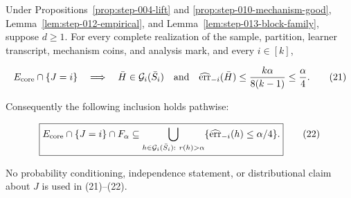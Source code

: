\begin{proposition}\label{prop:step-013-pathwise}
Under  Propositions~\ref{prop:step-004-lift} and
\ref{prop:step-010-mechanism-good}, Lemma~\ref{lem:step-012-empirical}, and
Lemma~\ref{lem:step-013-block-family}, suppose \(d\geq1\). For every
complete realization of the sample, partition, learner transcript,
mechanism coins, and analysis mark, and every \(i\in[k]\),

\[
 E_{\rm core}\cap\{J=i\}
 \quad\Longrightarrow\quad
 \bar H\in\mathcal G_i(\bar S_i)
 \quad\text{and}\quad
 \widehat{\operatorname{err}}_{-i}(\bar H)
 \leq\frac{k\alpha}{8(k-1)}\leq\frac\alpha4.
 \tag{21}
\]

Consequently the following inclusion holds pathwise:

\[
 \boxed{
 E_{\rm core}\cap\{J=i\}\cap F_\alpha
 \subseteq
 \bigcup_{h\in\mathcal G_i(\bar S_i):\ r(h)>\alpha}
 \{\widehat{\operatorname{err}}_{-i}(h)\leq\alpha/4\}.
 }
 \tag{22}
\]

No probability conditioning, independence statement, or distributional
claim about \(J\) is used in (21)--(22).


\end{proposition}

